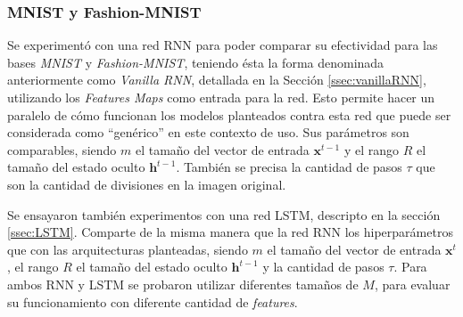 \documentclass[spanish]{article}
\theoremstyle{definition}
\theoremstyle{remark}
\numberwithin{equation}{section}
\numberwithin{equation}{section} %
\begin{document}
\subsubsection{MNIST y Fashion-MNIST}
Se experimentó con una red RNN para poder comparar su efectividad para las bases \textit{MNIST} y \textit{Fashion-MNIST}, teniendo ésta la forma denominada anteriormente como \textit{Vanilla RNN}, detallada en la Sección \ref{ssec:vanillaRNN}, utilizando los \textit{Features Maps} como entrada para la red. Esto permite hacer un paralelo de cómo funcionan los modelos planteados contra esta red que puede ser considerada como ``genérico'' en este contexto de uso. Sus parámetros son comparables, siendo $m$ el tamaño del vector de entrada $\textbf{x}^{t-1}$ y el rango $R$ el tamaño del estado oculto $\textbf{h}^{t-1}$. También se precisa la cantidad de pasos $\tau$ que son la cantidad de divisiones en la imagen original.    \par
Se ensayaron también experimentos con una red LSTM, descripto en la sección \ref{ssec:LSTM}. Comparte de la misma manera que la red RNN los hiperparámetros que con las arquitecturas planteadas, siendo $m$ el tamaño del vector de entrada $\textbf{x}^{t}$, el rango $R$ el tamaño del estado oculto $\textbf{h}^{t-1}$ y la cantidad de pasos $\tau$. Para ambos RNN y LSTM se probaron utilizar diferentes tamaños de $M$, para evaluar su funcionamiento con diferente cantidad de \textit{features}. 
\par
\end{document}
